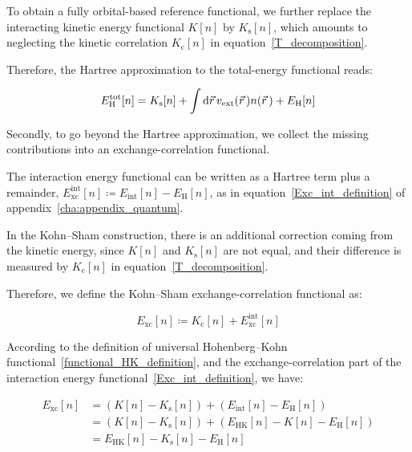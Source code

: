 To obtain a fully orbital-based reference functional,
we further replace the interacting kinetic energy functional $K[n]$ by $K_\mathrm{s}[n]$,
which amounts to neglecting the kinetic correlation $K_\mathrm{c}[n]$ in equation~\eqref{T_decomposition}.

Therefore, the Hartree approximation to the total-energy functional reads:

\begin{equation}
    E_\mathrm{H}^\mathrm{tot}[n]
    = K_\mathrm{s}[n]
    + \int \mathrm{d}{\vec{r}}\,v_\mathrm{ext}(\vec{r}\,)n(\vec{r}\,)
    + E_\mathrm{H}[n]
\label{hartree_total_energy_functional}
\end{equation}

Secondly, to go beyond the Hartree approximation,
we collect the missing contributions into an exchange-correlation functional.

The interaction energy functional can be written as a Hartree term plus a remainder,
$E_\mathrm{xc}^{\mathrm{int}}[n]\coloneqq E_\mathrm{int}[n]-E_\mathrm{H}[n]$,
as in equation~\eqref{Exc_int_definition} of appendix~\ref{cha:appendix_quantum}.

In the Kohn--Sham construction, there is an additional correction coming from the kinetic energy, since $K[n]$ and $K_\mathrm{s}[n]$ are not equal, and their difference is measured by $K_\mathrm{c}[n]$ in equation~\eqref{T_decomposition}.

Therefore, we define the Kohn--Sham exchange-correlation functional as:

\begin{equation}
    E_\mathrm{xc}[n]\coloneqq K_\mathrm{c}[n]+E_\mathrm{xc}^{\mathrm{int}}[n]
\label{Exc_KS_sum}
\end{equation}

According to the definition of universal Hohenberg--Kohn functional~\eqref{functional_HK_definition}, 
and the exchange-correlation part of the interaction energy functional~\eqref{Exc_int_definition},
we have:

\begin{equation}
\begin{aligned}
    E_\mathrm{xc}[n]
    &= (K[n]-K_\mathrm{s}[n]) + (E_\mathrm{int}[n]-E_\mathrm{H}[n]) \\
    &= (K[n]-K_\mathrm{s}[n]) + (E_\mathrm{HK}[n]-K[n]-E_\mathrm{H}[n]) \\
    &= E_\mathrm{HK}[n]-K_\mathrm{s}[n]-E_\mathrm{H}[n]
\end{aligned}
\label{Exc_KS_definition}
\end{equation}

